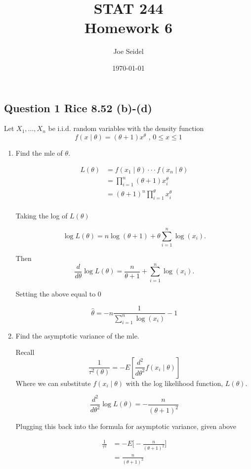 \documentclass{tufte-book}
\title{STAT 244 \\ Homework 6}
\author{Joe Seidel}
\date{\today}
\theoremstyle{mytheoremstyle}
\theoremstyle{mylemstyle}
\theoremstyle{mydefstyle}
\begin{document}
\maketitle
{}
\newpage
{}

\subsection{Question 1 Rice 8.52 (b)-(d)}
Let $X_1,...,X_n$ be i.i.d. random variables with the density function
\[ f(x\mid \theta) = (\theta + 1)x^\theta \text{ , } 0\leq x \leq 1 \]

\begin{enumerate}

\item Find the mle of $\theta$.

\begin{align*}
L(\theta) &= f(x_1 \mid \theta) \cdot \cdot \cdot f(x_n \mid \theta)\\
&= \prod_{i=1}^n (\theta + 1)x_i^\theta\\
&= (\theta+1)^n \prod_{i=1}^\theta x_i^\theta\\
\end{align*}

Taking the log of $L(\theta)$

\[ \log L(\theta) = n \log(\theta+1) + \theta \sum_{i=1}^n \log(x_i). \]

Then
\[ \frac{d}{d\theta}\log L(\theta) = \frac{n}{\theta+1} + \sum_{i=1}^n \log(x_i). \]

Setting the above equal to $0$ 

\[ \hat{\theta} = -n \frac{1}{\sum_{i=1}^n \log(x_i)} -1 \]

\item Find the asymptotic variance of the mle.

Recall
\[ \frac{1}{\tau^2(\theta)} = -E[\frac{d^2}{d\theta^2} f(x_i\mid\theta)] \]
Where we can substitute $f(x_i\mid \theta)$ with the log likelihood function, $L(\theta)$. 

\[ \frac{d^2}{d\theta^2}\log L(\theta) = -\frac{n}{(\theta +1)^2} \]

Plugging this back into the formula for asymptotic variance, given above

\begin{align*}
\frac{1}{\tau^2} &= -E\Big[-\frac{n}{(\theta +1)^2}\Big]\\
&= \frac{n}{(\theta+1)^2}\\
\end{align*}


\end{enumerate}
\end{document}
